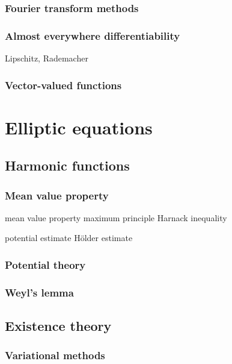 \documentclass{../../large}
\begin{document}
\section{Fourier transform methods}
\section{Almost everywhere differentiability}
Lipschitz, Rademacher
\section{Vector-valued functions}








\part{Elliptic equations}


\chapter{Harmonic functions}
\section{Mean value property}
mean value property
maximum principle
Harnack inequality

potential estimate
H\"older estimate

\section{Potential theory}

\section{Weyl's lemma}



\chapter{Existence theory}

\section{Variational methods}
\end{document}

